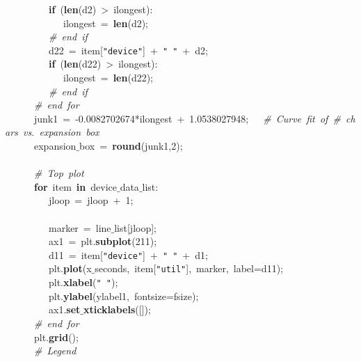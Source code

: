 \mbox{}\ \ \ \ \ \ \ \ \ \textbf{if}\ (\textbf{len}(d2)\ \textgreater{}\ ilongest): \\
\mbox{}\ \ \ \ \ \ \ \ \ \ \ \ ilongest\ =\ \textbf{len}(d2); \\
\mbox{}\ \ \ \ \ \ \ \ \ \textit{\#\ end\ if} \\
\mbox{}\ \ \ \ \ \ \ \ \ d22\ =\ item[\texttt{"{}device"{}}]\ +\ \texttt{"{}\ "{}}\ +\ d2; \\
\mbox{}\ \ \ \ \ \ \ \ \ \textbf{if}\ (\textbf{len}(d22)\ \textgreater{}\ ilongest): \\
\mbox{}\ \ \ \ \ \ \ \ \ \ \ \ ilongest\ =\ \textbf{len}(d22); \\
\mbox{}\ \ \ \ \ \ \ \ \ \textit{\#\ end\ if} \\
\mbox{}\ \ \ \ \ \ \textit{\#\ end\ for} \\
\mbox{}\ \ \ \ \ \ junk1\ =\ -0.0082702674*ilongest\ +\ 1.0538027948;\ \ \ \textit{\#\ Curve\ fit\ of\ \#\ chars\ vs.\ expansion\ box} \\
\mbox{}\ \ \ \ \ \ expansion$\_$box\ =\ \textbf{round}(junk1,2); \\
\mbox{}\ \ \ \ \ \  \\
\mbox{}\ \ \ \ \ \ \textit{\#\ Top\ plot} \\
\mbox{}\ \ \ \ \ \ \textbf{for}\ item\ \textbf{in}\ device$\_$data$\_$list: \\
\mbox{}\ \ \ \ \ \ \ \ \ jloop\ =\ jloop\ +\ 1; \\
\mbox{}\ \ \ \ \ \ \ \ \  \\
\mbox{}\ \ \ \ \ \ \ \ \ marker\ =\ line$\_$list[jloop]; \\
\mbox{}\ \ \ \ \ \ \ \ \ ax1\ =\ plt.\textbf{subplot}(211); \\
\mbox{}\ \ \ \ \ \ \ \ \ d11\ =\ item[\texttt{"{}device"{}}]\ +\ \texttt{"{}\ "{}}\ +\ d1; \\
\mbox{}\ \ \ \ \ \ \ \ \ plt.\textbf{plot}(x$\_$seconds,\ item[\texttt{"{}util"{}}],\ marker,\ label=d11); \\
\mbox{}\ \ \ \ \ \ \ \ \ plt.\textbf{xlabel}(\texttt{"{}\ "{}}); \\
\mbox{}\ \ \ \ \ \ \ \ \ plt.\textbf{ylabel}(ylabel1,\ fontsize=fsize); \\
\mbox{}\ \ \ \ \ \ \ \ \ ax1.\textbf{set$\_$xticklabels}([]); \\
\mbox{}\ \ \ \ \ \ \textit{\#\ end\ for} \\
\mbox{}\ \ \ \ \ \ plt.\textbf{grid}(); \\
\mbox{}\ \ \ \ \ \ \textit{\#\ Legend} \\
